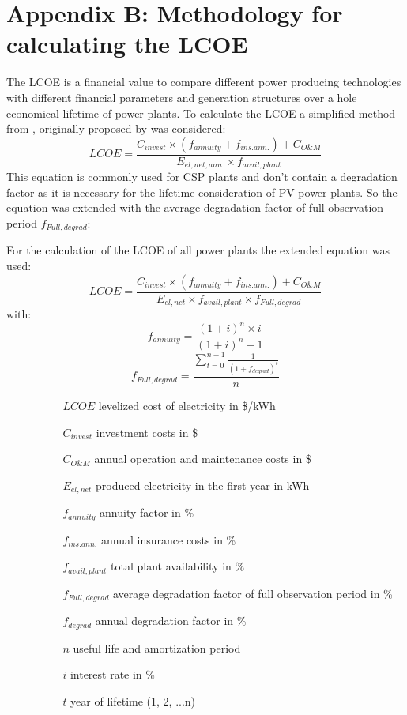 \chapter{Appendix B: Methodology for calculating the LCOE} \label{ChapterLCOE}
The LCOE is a financial value to compare different power producing technologies with different financial parameters and generation structures over a hole economical lifetime of power plants. To calculate the LCOE a simplified method from \cite{Morin2012}, originally proposed by \cite{Roy1997} was considered:
\begin{equation}
LCOE=\frac{C_{invest}\times(f_{annuity}+f_{ins.ann.})+C_{O\&M}}{E_{el,net,ann.}\times f_{avail,plant}} \label{LCOEold}
\end{equation}
This equation is commonly used for CSP plants and don't contain a degradation factor as it is necessary for the lifetime consideration of PV power plants. So the equation was extended with the average degradation factor of full observation period $f_{Full,degrad}$:

For the calculation of the LCOE of all power plants the extended equation was used:
\begin{equation}
LCOE=\frac{C_{invest}\times(f_{annuity}+f_{ins.ann.})+C_{O\&M}}{E_{el,net}\times f_{avail,plant} \times f_{Full,degrad}}\label{LCOE}
\end{equation}
with:
\begin{equation}
f_{annuity} = \frac{(1+i)^n \times i}{(1+i)^n-1} \label{annuity}
\end{equation}
\begin{equation}
f_{Full,degrad} = \frac{\sum\limits_{t=0}^{n-1} \frac{1}{(1+f_{degrad})^{t}}}{n} \label{GL_Degradationfactor}
\end{equation} 
\begin{itemize}
\item[ ] 
\begin{itemize}
\item[ ] 
\begin{itemize}
\item[$LCOE$]levelized cost of electricity in \$/kWh
\item[$C_{invest}$]investment costs in \$
\item[$C_{O\&M}$]annual operation and maintenance costs in \$
\item[$E_{el,net}$]produced electricity in the first year in kWh
\item[$f_{annuity}$]annuity factor in \%
\item[$f_{ins.ann.}$]annual insurance costs in \%
\item[$f_{avail,plant}$]total plant availability in \%
\item[$f_{Full,degrad}$]average degradation factor of full observation period in \%
\item[$f_{degrad}$]annual degradation factor in \%
\item[$n$]useful life and amortization period
\item[$i$]interest rate in \%
\item[$t$]year of lifetime (1, 2, ...n)
\end{itemize}
\end{itemize}
\end{itemize}
